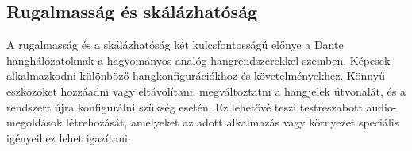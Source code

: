 \subsection{Rugalmasság és skálázhatóság}
A rugalmasság és a skálázhatóság két kulcsfontosságú előnye a Dante
hanghálózatoknak a hagyományos analóg hangrendszerekkel szemben.
Képesek alkalmazkodni különböző hangkonfigurációkhoz és követelményekhez. 
Könnyű eszközöket hozzáadni vagy eltávolítani, megváltoztatni a hangjelek útvonalát, és a rendszert újra
konfigurálni szükség esetén. Ez lehetővé teszi testreszabott audio-megoldások
létrehozását, amelyeket az adott alkalmazás vagy környezet speciális igényeihez
lehet igazítani. 


